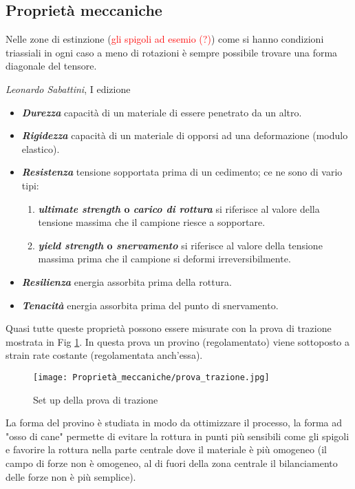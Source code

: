 \subsection{Proprietà meccaniche}

\epigraph{Nelle zone di estinzione (\textcolor{red}{gli spigoli ad esemio (?)}) come si hanno condizioni triassiali in ogni caso a meno di rotazioni è sempre possibile trovare una forma diagonale del tensore.}{\textit{Leonardo Sabattini}, I edizione}

\begin{itemize}
    \item \textbf{\textit{Durezza}} capacità di un materiale di essere penetrato da un altro.
    \item \textbf{\textit{Rigidezza}} capacità di un materiale di opporsi ad una deformazione (modulo elastico).
    \item \textbf{\textit{Resistenza}} tensione sopportata prima di un cedimento; ce ne sono di vario tipi:
    \begin{enumerate}
        \item \textbf{\textit{ultimate strength} o \textit{carico di rottura}} si riferisce al valore della tensione massima che il campione riesce a sopportare.
         \item \textbf{\textit{yield strength} o \textit{snervamento}} si riferisce al valore della tensione massima prima che il campione si deformi irreversibilmente.
    \end{enumerate}
    \item \textbf{\textit{Resilienza}} energia assorbita prima della rottura.
    \item \textbf{\textit{Tenacità}} energia assorbita prima del punto di snervamento.
\end{itemize}
Quasi tutte queste proprietà possono essere misurate con la prova di trazione mostrata in Fig \ref{fig:prova-trazione}. In questa prova un provino (regolamentato) viene sottoposto a strain rate costante (regolamentata anch'essa).
\begin{figure}[h]
    \centering
    \texttt{[image: Proprietà\_meccaniche/prova\_trazione.jpg]}
    \caption{Set up della prova di trazione}
    \label{fig:prova-trazione}
\end{figure}
La forma del provino è studiata in modo da ottimizzare il processo, la forma ad "osso di cane" permette di evitare la rottura in punti più sensibili come gli spigoli e favorire la rottura nella parte centrale dove il materiale è più omogeneo (il campo di forze non è omogeneo, al di fuori della zona centrale il bilanciamento delle forze non è più semplice).
